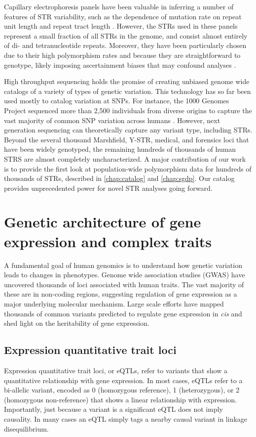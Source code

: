 Capillary electrophoresis panels have been valuable in inferring a number of features of STR variability, such as the dependence of mutation rate on repeat unit length \cite{JarveZhivotovskyRootsiEtAl2009} and repeat tract length \cite{SunHelgasonMassonEtAl2012}. However, the STRs used in these panels represent a small fraction of all STRs in the genome, and consist almost entirely of di- and tetranucleotide repeats. Moreover, they have been particularly chosen due to their high polymorphism rates and because they are straightforward to genotype, likely imposing ascertainment biases that may confound analyses \cite{ErikssonManicaScherer2011}.

High throughput sequencing holds the promise of creating unbiased genome wide catalogs of a variety of types of genetic variation. This technology has so far been used mostly to catalog variation at SNPs. For instance,  the 1000 Genomes Project sequenced more than 2,500 individuals from diverse origins to capture the vast majority of common SNP variation across humans \cite{AbecasisAltshulerAutonEtAl2010}. However, next generation sequencing can theoretically capture any variant type, including STRs. Beyond the several thousand Marshfield, Y-STR, medical, and forensics loci that have been widely genotyped, the remaining hundreds of thousands of human STRS are almost completely uncharacterized. A major contribution of our work is to provide the first look at population-wide polymorphism data for hundreds of thousands of STRs, described in \autoref{chap:catalog} and \autoref{chap:sgdp}. Our catalog provides unprecedented power for novel STR analyses going forward.

\section{Genetic architecture of gene expression and complex traits}
\label{sec:introarch}

A fundamental goal of human genomics is to understand how genetic variation leads to changes in phenotypes. Genome wide association studies (GWAS) have uncovered thousands of loci associated with human traits. The vast majority of these are in non-coding regions, suggesting regulation of gene expression as a major underlying molecular mechanism. Large scale efforts have mapped thousands of common variants predicted to regulate gene expression in \emph{cis} and shed light on the heritability of gene expression.

\subsection{Expression quantitative trait loci}
Expression quantitative trait loci, or eQTLs, refer to variants that show a quantitative relationship with gene expression. In most cases, eQTLs refer to a bi-allelic variant, encoded as 0 (homozygous reference), 1 (heterozygous), or 2 (homozygous non-reference) that shows a linear relationship with expression. Importantly, just because a variant is a significant eQTL does not imply causality. In many cases an eQTL simply tags a nearby causal variant in linkage disequilibrium.

